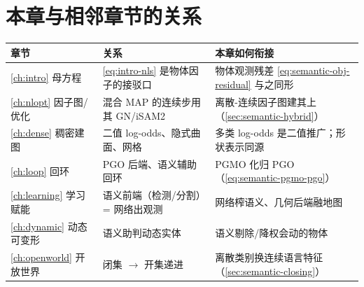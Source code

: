 \section*{本章与相邻章节的关系}
\begin{table}[H]\centering\small
\begin{tabular}{lll}
\toprule
章节 & 关系 & 本章如何衔接 \\
\midrule
\cref{ch:intro} 母方程 & \cref{eq:intro-nls} 是物体因子的接驳口 & 物体观测残差 \cref{eq:semantic-obj-residual} 与之同形 \\
\cref{ch:nlopt} 因子图/优化 & 混合 MAP 的连续步用其 GN/iSAM2 & 离散-连续因子图建其上（\cref{sec:semantic-hybrid}）\\
\cref{ch:dense} 稠密建图 & 二值 log-odds、隐式曲面、网格 & 多类 log-odds 是二值推广；形状表示同源 \\
\cref{ch:loop} 回环 & PGO 后端、语义辅助回环 & PGMO 化归 PGO（\cref{eq:semantic-pgmo-pgo}）\\
\cref{ch:learning} 学习赋能 & 语义前端（检测/分割）= 网络出观测 & 网络榨语义、几何后端融地图 \\
\cref{ch:dynamic} 动态可变形 & 语义助判动态实体 & 语义剔除/降权会动的物体 \\
\cref{ch:openworld} 开放世界 & 闭集 $\to$ 开集递进 & 离散类别换连续语言特征（\cref{sec:semantic-closing}）\\
\bottomrule
\end{tabular}
\end{table}

